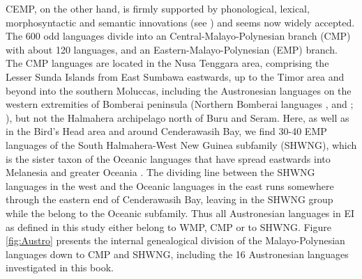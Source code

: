 CEMP, on the other hand, is firmly supported by phonological, lexical, morphosyntactic and semantic innovations (see \citealt{blust1993central}) and seems now widely accepted. The 600 odd languages divide into an Central-Malayo-Polynesian branch (CMP) with about 120 languages, and an Eastern-Malayo-Polynesian (EMP) branch. The CMP languages are located in the Nusa Tenggara area, comprising the Lesser Sunda Islands from East Sumbawa eastwards, up to the Timor area and beyond into the southern Moluccas, including the Austronesian languages on the western extremities of Bomberai peninsula (Northern Bomberai languages ,  and ; \citealt[24]{adelaar2005austronesian}), but not the Halmahera archipelago north of Buru and Seram. Here, as well as in the Bird's Head area and around Cenderawasih Bay, we find 30-40 EMP languages of the South Halmahera-West New Guinea subfamily (SHWNG), which is the sister taxon of the Oceanic languages that have spread eastwards into Melanesia and greater Oceania \citep{blust2009austronesian}. The dividing line between the SHWNG languages in the west and the Oceanic languages in the east runs somewhere through the eastern end of Cenderawasih Bay, leaving  in the SHWNG group while the  belong to the Oceanic subfamily. Thus all Austronesian languages in EI as defined in this study either belong to WMP, CMP or to SHWNG. Figure \ref{fig:Austro} presents the internal genealogical division of the Malayo-Polynesian languages down to CMP and SHWNG, including the 16 Austronesian languages investigated in this book.

